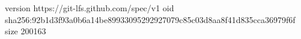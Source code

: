 version https://git-lfs.github.com/spec/v1
oid sha256:92b1d3f93a0b6a14be89933095292927079c85c03d8aa8f41d835cca36979f6f
size 200163
